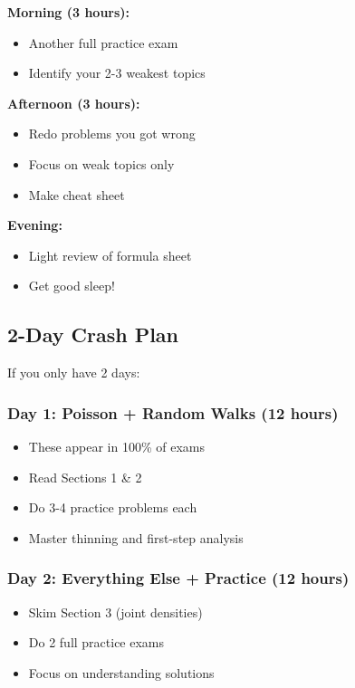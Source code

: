 \documentclass[10pt,letterpaper]{article}
\begin{document}
\textbf{Morning (3 hours):}
\begin{itemize}
  \item Another full practice exam
  \item Identify your 2-3 weakest topics
\end{itemize}

\textbf{Afternoon (3 hours):}
\begin{itemize}
  \item Redo problems you got wrong
  \item Focus on weak topics only
  \item Make cheat sheet
\end{itemize}

\textbf{Evening:}
\begin{itemize}
  \item Light review of formula sheet
  \item Get good sleep!
\end{itemize}

\subsection{2-Day Crash Plan}

If you only have 2 days:

\subsubsection{Day 1: Poisson + Random Walks (12 hours)}
\begin{itemize}
  \item These appear in 100\% of exams
  \item Read Sections 1 \& 2
  \item Do 3-4 practice problems each
  \item Master thinning and first-step analysis
\end{itemize}

\subsubsection{Day 2: Everything Else + Practice (12 hours)}
\begin{itemize}
  \item Skim Section 3 (joint densities)
  \item Do 2 full practice exams
  \item Focus on understanding solutions
\end{itemize}
\end{document}

